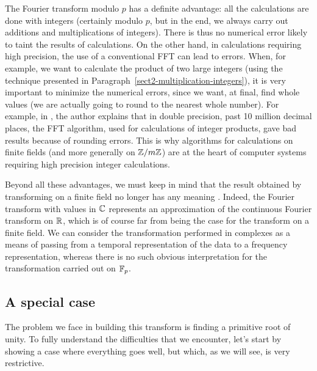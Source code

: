  
 
 The Fourier transform modulo $ p $ has a definite advantage: all the calculations are done with integers (certainly modulo $ p $, but in the end, we always carry out additions and multiplications of integers). There is thus no numerical error likely to taint the results of calculations. On the other hand, in calculations requiring high precision, the use of a conventional FFT can lead to errors. When, for example, we want to calculate the product of two large integers (using the technique presented in Paragraph~\ref{sect2-multiplication-integers}), it is very important to minimize the numerical errors, since we want, at final, find whole values (we are actually going to round to the nearest whole number). For example, in \cite{bailey-pi}, the author explains that in double precision, past 10 million decimal places, the FFT algorithm, used for calculations of integer products, gave bad results because of rounding errors. This is why algorithms for calculations on finite fields (and more generally on $ \mathbb{Z}/m \mathbb{Z} $) are at the heart of computer systems requiring high precision integer calculations.
 
 
Beyond all these advantages, we must keep in mind that the result obtained by transforming on a finite field no longer has any meaning . Indeed, the Fourier transform with values in $ \mathbb{C} $ represents an approximation of the continuous Fourier transform on $ \mathbb{R} $, which is of course far from being the case for the transform on a finite field. We can consider the transformation performed in complexes as a means of passing from a temporal representation of the data to a frequency representation, whereas there is no such obvious interpretation for the transformation carried out on $ \mathbb{F}_p $.

\subsection{A special case}
\label{sect2-a-particular-case}
 
 
The problem we face in building this transform is finding a primitive  root of unity. To fully understand the difficulties that we encounter, let's start by showing a case where everything goes well, but which, as we will see, is very restrictive.
 
